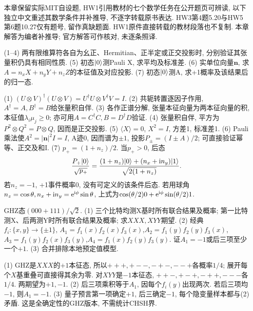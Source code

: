 本章保留实际MIT自设题, HW1引用教材的七个数学任务在公开题页可辨读, 以下独立中文重述其数学条件并补推导, 不逐字转载原书表达. HW3第4题5.20与HW5第6题10.27仅有题号, 留作真缺题面. HW1原件直接转载的教材段落也不复制. 本章解答为编者补推导; 官方解答可作核对, 未逐条照译.
\begin{exercise}(1--4) 两有限维算符各自为幺正、Hermitian、正半定或正交投影时, 分别验证其张量积仍具有相同性质. (5) 初态$\lvert 0\rangle$测Pauli X, 求平均及标准差. (6) 实单位向量$\mathbf n$, 求$A=n_xX+n_yY+n_zZ$的本征值及对应投影. (7) 初态$\lvert 0\rangle$测A, 求+1概率及该结果后的归一态.\end{exercise}
\begin{solution}(1) $(U\otimes V)^\dagger(U\otimes V)=U^\dagger U\otimes V^\dagger V=I$. (2) 共轭转置逐因子作用, $A^\dagger=A,B^\dagger=B$给张量积自伴. (3) 各作正谱分解, 张量本征向量为两本征向量的积, 本征值$\lambda_i\mu_j\ge0$; 亦可用$A=C^\dagger C,B=D^\dagger D$验证. (4) 张量积自伴, 平方为$P^2\otimes Q^2=P\otimes Q$, 因而是正交投影.
(5) $\langle X\rangle=0$, $X^2=I$, 方差1, 标准差1. (6) Pauli乘法使$A^2=|\mathbf n|^2I=I$, A迹0, 因而谱为$\pm1$, 投影$P_\pm=(I\pm A)/2$; 可直接验证幂等、正交及和I. (7) $p_+=(1+n_z)/2$. 当$p_+>0$, 后态
\[\frac{P_+\lvert 0\rangle}{\sqrt{p_+}}=\frac{(1+n_z)\lvert 0\rangle+(n_x+\mathrm i n_y)\lvert 1\rangle}{\sqrt{2(1+n_z)}}.\]
若$n_z=-1$, +1事件概率0, 没有可定义的该条件后态. 若用球角$n_z=\cos\theta,n_x+\mathrm i n_y=\mathrm e^{\mathrm i\phi}\sin\theta$, 上式为$\cos(\theta/2)0+\mathrm e^{\mathrm i\phi}\sin(\theta/2)1$.\end{solution}

\begin{exercise}GHZ态$(000+111)/\sqrt2$. (1) 三个比特均测X基时所有联合结果及概率; 第一比特测X、后两测Y时所有联合结果及概率; 求$XXX,XYY$期望. (2) 经典$f_i:\{x,y\}\to\{\pm1\}$, $A_1=f_1(x)f_2(x)f_3(x)$,$A_2=f_1(y)f_2(y)f_3(x)$,$A_3=f_1(y)f_2(x)f_3(y)$,$A_4=f_1(x)f_2(y)f_3(y)$. 证$A_1=-1$或后三项至少一个$+1$. (3) 合并排除本地预定值模型.\end{exercise}
\begin{solution}(1) GHZ是$XXX$的$+1$本征态, 所以$+++,+--,-+-,--+$各概率$1/4$; 展开每个$X$基重叠可直接得其余为零. 对$XYY$是$-1$本征态, $++-,+-+,-++,---$各$1/4$. 两期望为$+1,-1$. (2) 后三项乘积等于$A_1$, 因每个$f_i(y)$出现两次. 若后三项均$-1$, 则$A_1=-1$. (3) 量子预言第一项确定$+1$, 后三确定$-1$, 每个隐变量样本都与(2)矛盾. 这是全确定性的GHZ版本, 不需统计CHSH界.
\end{solution}

